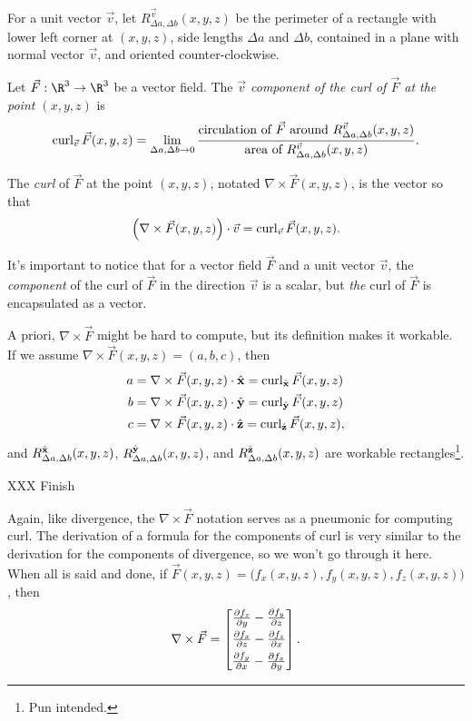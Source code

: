 \begin{definition}[Curl]
	For a unit vector $\vec v$, 
	let $R^{\vec v}_{\Delta a,\Delta b}(x,y,z)$ be the perimeter
	of a rectangle with lower left
	corner at $(x,y,z)$, side lengths $\Delta a$ and $\Delta b$, contained
	in a plane with normal vector $\vec v$, and oriented counter-clockwise.

	Let $\vec F:\R^3\to\R^3$ be a vector field.  The \emph{$\vec v$
	component of the curl of $\vec F$ at the point $(x,y,z)$} is
	\[
		\operatorname{curl}_{\vec v}\vec F(x,y,z) = \lim_{\Delta a,\Delta b\to 0}
		\frac{
			\text{circulation of }\vec F\text{ around }R^{\vec v}_{\Delta a,\Delta b}(x,y,z)
			}{
			\text{area of }R^{\vec v}_{\Delta a,\Delta b}(x,y,z)}.
	\]

	The \emph{curl} of $\vec F$ at the point $(x,y,z)$, notated
	$\nabla \times \vec F(x,y,z)$, is the vector so that
	\[\Big(\nabla \times \vec F(x,y,z)\Big)\cdot \vec v = \operatorname{curl}_{\vec v}\vec F(x,y,z).\]
\end{definition}

It's important to notice that for a vector field $\vec F$
and a unit vector $\vec v$, the \emph{component} of the curl of $\vec F$ in the direction
$\vec v$ is a scalar, but \emph{the} curl  of $\vec F$ is encapsulated as a vector.

A priori, $\nabla \times \vec F$ might be hard to compute, but its definition 
makes it workable.  If we assume $\nabla \times \vec F(x,y,z)=(a,b,c)$, then
\begin{align*}
	a &= \nabla \times \vec F(x,y,z)\cdot {\hat {\mathbf x}} = \operatorname{curl}_{{\hat {\mathbf x}}} \vec F(x,y,z)\\
	b &= \nabla \times \vec F(x,y,z)\cdot {\hat {\mathbf y}} = \operatorname{curl}_{{\hat {\mathbf y}}} \vec F(x,y,z)\\
	c &= \nabla \times \vec F(x,y,z)\cdot {\hat {\mathbf z}} = \operatorname{curl}_{{\hat {\mathbf z}}} \vec F(x,y,z),
\end{align*}
and $R^{{\hat {\mathbf x}}}_{\Delta a,\Delta b}(x,y,z)$, $R^{{\hat {\mathbf y}}}_{\Delta a,\Delta b}(x,y,z)$,
and
$R^{{\hat {\mathbf z}}}_{\Delta a,\Delta b}(x,y,z)$ are workable rectangles\footnote{ Pun intended.}.

\begin{example}
	XXX Finish
\end{example}

Again, like divergence, the $\nabla \times \vec F$ notation serves as a pneumonic
for computing curl.  The derivation of a formula for the components of curl
is very similar to the derivation for the components of divergence, so we won't go
through it here.  When all is said and done, if $\vec F(x,y,z) = \Big(f_x(x,y,z),f_y(x,y,z),
f_z(x,y,z)\Big)$, then
\[
	\nabla \times \vec F = \mat{
		\tfrac{\partial f_z}{\partial y} - \tfrac{\partial f_y}{\partial z}\\[4pt]
		\tfrac{\partial f_x}{\partial z} - \tfrac{\partial f_z}{\partial x}\\[4pt]
		\tfrac{\partial f_y}{\partial x} - \tfrac{\partial f_x}{\partial y}
		}.
\]

